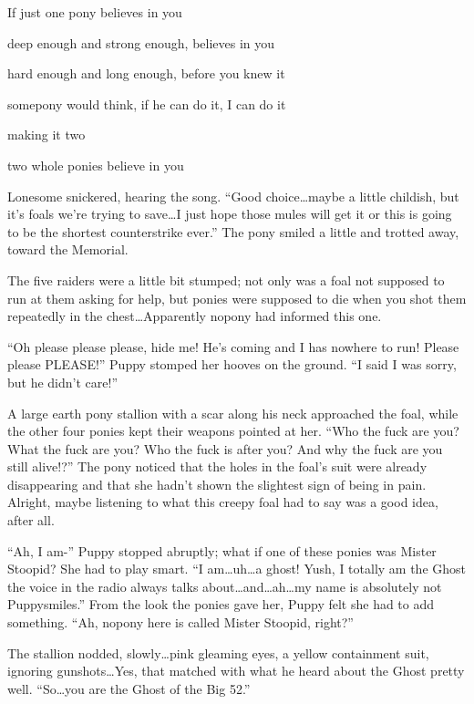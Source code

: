 \begin{song}
    If just one pony believes in you

    deep enough and strong enough, believes in you

    hard enough and long enough, before you knew it

    somepony would think, if he can do it, I can do it

    making it two

    two whole ponies believe in you
\end{song}

Lonesome snickered, hearing the song. ``Good choice\dots maybe a little childish, but it's foals we're trying to save\dots I just hope those mules will get it or this is going to be the shortest counterstrike ever.'' The pony smiled a little and trotted away, toward the Memorial.

\horizonline


The five raiders were a little bit stumped; not only was a foal not supposed to run at them asking for help, but ponies were supposed to die when you shot them repeatedly in the chest\dots Apparently nopony had informed this one.

``Oh please please please, hide me! He's coming and I has nowhere to run! Please please PLEASE!'' Puppy stomped her hooves on the ground. ``I said I was sorry, but he didn't care!''

A large earth pony stallion with a scar along his neck approached the foal, while the other four ponies kept their weapons pointed at her. ``Who the fuck are you? What the fuck are you? Who the fuck is after you? And why the fuck are you still alive!?'' The pony noticed that the holes in the foal's suit were already disappearing and that she hadn't shown the slightest sign of being in pain. Alright, maybe listening to what this creepy foal had to say was a good idea, after all.

``Ah, I am-'' Puppy stopped abruptly; what if one of these ponies was Mister Stoopid? She had to play smart. ``I am\dots uh\dots a ghost! Yush, I totally am the Ghost the voice in the radio always talks about\dots and\dots ah\dots my name is absolutely not Puppysmiles.'' From the look the ponies gave her, Puppy felt she had to add something. ``Ah, nopony here is called Mister Stoopid, right?''

The stallion nodded, slowly\dots pink gleaming eyes, a yellow containment suit, ignoring gunshots\dots Yes, that matched with what he heard about the Ghost pretty well. ``So\dots you are the Ghost of the Big 52.''

